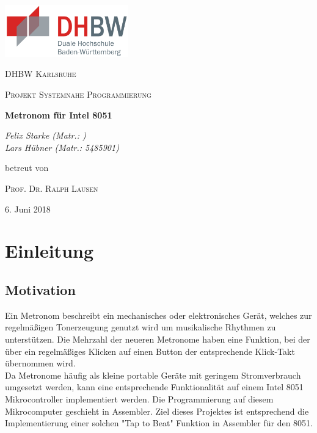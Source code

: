 \documentclass[a4paper, 12pt]{scrartcl}
\title{\titel}
\author{\autorenWithMatr}
\date{\datum}
\def \autorenWithMatr {Felix Starke (Matr.: )\\
 Lars Hübner (Matr.: 5485901)} %
\def \titel {Metronom für Intel 8051}
\def \arbeit {Projekt Systemnahe Programmierung}
\def \uni {DHBW Karlsruhe}
\def \betreuer {Prof. Dr. Ralph Lausen}
\def \datum {6. Juni 2018}
\begin{document}
\begin{onehalfspace}

\begin{titlepage}
	\centering
	\includegraphics[width=0.4\textwidth]{dhbw.png}\par\vspace{1cm}
	{\scshape\LARGE \uni \par}
	\vspace{1cm}
	{\scshape\Large \arbeit\par}
	\vspace{1.5cm}
	{\huge\bfseries \titel\par}
	\vspace{2cm}
	{\Large\itshape \autorenWithMatr\par}
	\vfill
	betreut von\par
	\textsc{\betreuer}

	\vfill

	{\large \datum\par}
\end{titlepage}

\newpage
\tableofcontents
\newpage

\section{Einleitung}
\subsection{Motivation}
Ein Metronom beschreibt ein mechanisches oder elektronisches Gerät, welches zur regelmäßigen Tonerzeugung genutzt wird um musikalische Rhythmen zu unterstützen. Die Mehrzahl der neueren Metronome haben eine Funktion, bei der über ein regelmäßiges Klicken auf einen Button der entsprechende Klick-Takt übernommen wird.
\\
Da Metronome häufig als kleine portable Geräte mit geringem Stromverbrauch umgesetzt werden, kann eine entsprechende Funktionalität auf einem Intel 8051 Mikrocontroller implementiert werden. Die Programmierung auf diesem Mikrocomputer geschieht in Assembler. Ziel dieses Projektes ist entsprechend die Implementierung einer solchen "Tap to Beat" Funktion in Assembler für den 8051.


\end{onehalfspace}
\end{document}
